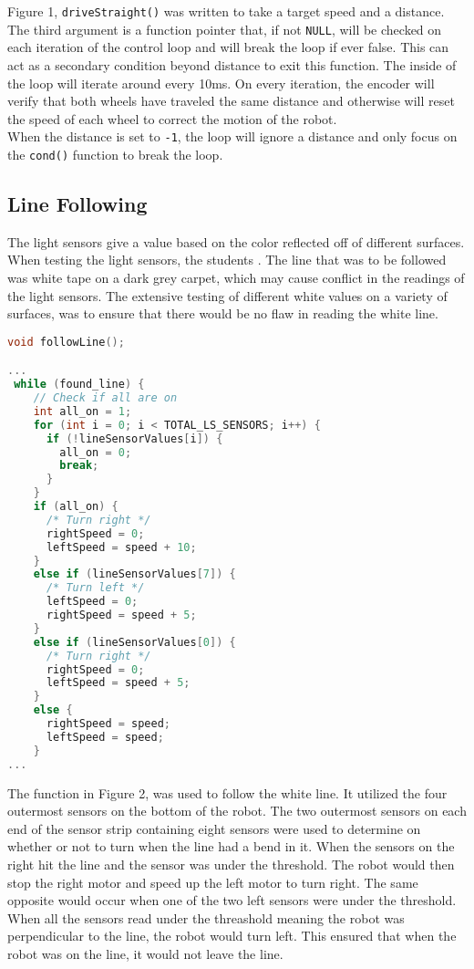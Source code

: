 \documentclass[CMPE]{KGCOEReport}
\def\code#1{\texttt{#1}}
\begin{document}
Figure 1, \code{driveStraight()} was written to take a target speed and a distance. The third argument is a function pointer that, if not \code{NULL}, will be checked on each iteration of the control loop and will break the loop if ever false. This can act as a secondary condition beyond distance to exit this function. The inside of the loop will iterate around every 10ms. On every iteration, the encoder will verify that both wheels have traveled the same distance and otherwise will reset the speed of each wheel to correct the motion of the robot. \\

When the distance is set to \code{-1}, the loop will ignore a distance and only focus on the \code{cond()} function to break the loop.


\subsection*{Line Following}

The light sensors give a value based on the color reflected off of different surfaces. When testing the light sensors, the students . The line that was to be followed was white tape on a dark grey carpet, which may cause conflict in the readings of the light sensors. The extensive testing of different white values on a variety of surfaces, was to ensure that there would be no flaw in reading the white line.


\begin{center}
\begin{lstlisting}[language=C]
void followLine();

...
 while (found_line) {
    // Check if all are on
    int all_on = 1;
    for (int i = 0; i < TOTAL_LS_SENSORS; i++) {
      if (!lineSensorValues[i]) {
        all_on = 0;
        break;
      }
    }
    if (all_on) {
      /* Turn right */
      rightSpeed = 0;
      leftSpeed = speed + 10;
    }
    else if (lineSensorValues[7]) {
      /* Turn left */
      leftSpeed = 0;
      rightSpeed = speed + 5;
    }
    else if (lineSensorValues[0]) {
      /* Turn right */
      rightSpeed = 0;
      leftSpeed = speed + 5;
    }
    else {
      rightSpeed = speed;
      leftSpeed = speed;
    }
...
\end{lstlisting}
\captionof{figure}{Part of the \code{followLine()} implmentation}
\end{center}

The function in Figure 2, was used to follow the white line. It utilized the four outermost sensors on the bottom of the robot. The two outermost sensors on each end of the sensor strip containing eight sensors were used to determine on whether or not to turn when the line had a bend in it. When the sensors on the right hit the line and the sensor was under the threshold. The robot would then stop the right motor and speed up the left motor to turn right. The same opposite would occur when one of the two left sensors were under the threshold. When all the sensors read under the threashold meaning the robot was perpendicular to the line, the robot would turn left. This ensured that when the robot was on the line, it would not leave the line. \\
\end{document}
